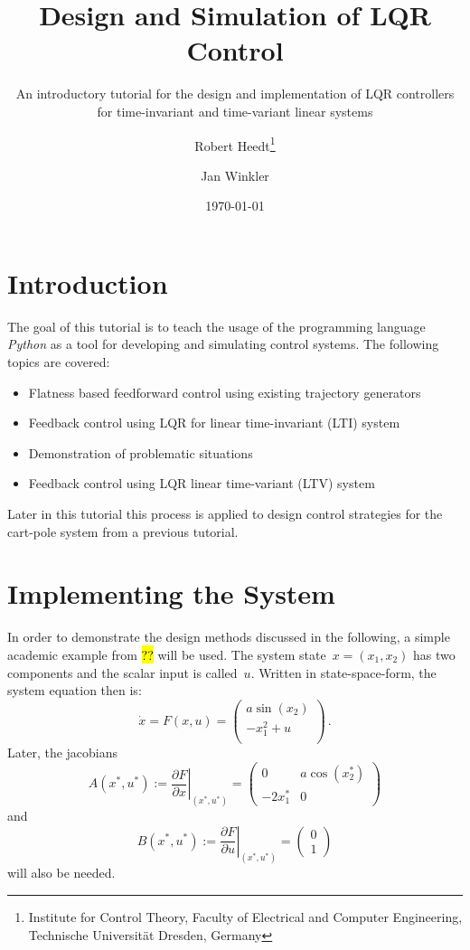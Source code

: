 \documentclass[a4paper,11pt,headinclude=true,headsepline,parskip=half,DIV=13]{scrartcl}
\title{Design and Simulation of LQR Control}
\subtitle{An introductory tutorial for the design and implementation of LQR controllers for time-invariant and time-variant linear systems}
\author{Robert Heedt\thanks{Institute for Control Theory, Faculty of Electrical and Computer Engineering, Technische Universität Dresden, Germany} \and Jan Winkler\footnotemark[1]}
\date{\today}
\newcommand{\py}{\emph{Python}\xspace}
\begin{document}
\maketitle




\tableofcontents

\newpage

\section{Introduction}
The goal of this tutorial is to teach the usage of the programming language \py as a tool for developing and simulating control systems.
The following topics are covered:
\begin{itemize}
    \item Flatness based feedforward control using existing trajectory generators
    \item Feedback control using LQR for linear time-invariant (LTI) system
    \item Demonstration of problematic situations
    \item Feedback control using LQR linear time-variant (LTV) system
\end{itemize}
Later in this tutorial this process is applied to design control strategies for the cart-pole system from a previous tutorial.

\section{Implementing the System}
In order to demonstrate the design methods discussed in the following, a simple academic example from \hl{??} will be used.
The system state~$x=(x_1, x_2)$ has two components and the scalar input is called~$u$.
Written in state-space-form, the system equation then is:
\begin{equation}
\dot x = F(x, u) = 
\begin{pmatrix}
a \sin(x_2)\\
-x_1^2+u\\
\end{pmatrix}\,.
\label{eq:academic_example_ss}
\end{equation}
Later, the jacobians
\begin{equation}
A(x^*, u^*) := \left.\frac{\partial F}{\partial x}\right\vert_{(x^*, u^*)}= \begin{pmatrix}0 & a \cos(x^*_2)\\-2 x^*_1 & 0\end{pmatrix}
\end{equation}
and
\begin{equation}
B(x^*, u^*) := \left.\frac{\partial F}{\partial u}\right\vert_{(x^*, u^*)}= \begin{pmatrix}0 \\ 1\end{pmatrix}
\end{equation}
will also be needed.
\end{document}
